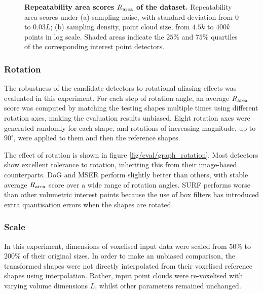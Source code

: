 \begin{figure}[ht]
\begin{subfigure}[t]{0.49\linewidth}
		\label{fig/eval/graph_sample}
	\end{subfigure}
	\caption{\textbf{Repeatability area scores $R_\textrm{area}$ of the \meshset dataset.} Repeatability area scores under (a) sampling noise, with standard deviation from $0$ to $0.03L$; (b) sampling density, \ie point cloud size, from $4.5k$ to $400k$ points in log scale. Shaded areas indicate the $25\%$ and $75\%$ quartiles of the corresponding interest point detectors.}
	\label{fig/eval/graph_graph0} 
\end{figure}

\subsubsection{Rotation}

The robustness of the candidate detectors to rotational aliasing effects was evaluated in this experiment. For each step of rotation angle, an average $R_\textrm{area}$ score was computed by matching the testing shapes multiple times using different rotation axes, making the evaluation results unbiased. Eight rotation axes were generated randomly for each shape, and rotations of increasing magnitude, up to $90^\circ$, were applied to them and then the reference shapes. 

The effect of rotation is shown in figure \ref{fig/eval/graph_rotation}. Most detectors show excellent tolerance to rotation, inheriting this from their image-based counterparts. 
DoG and MSER perform slightly better than others, with stable average $R_\textrm{area}$ score over a wide range of rotation angles. SURF performs worse than other volumetric interest points because the use of box filters has introduced extra quantisation errors when the shapes are rotated.

\subsubsection{Scale}

In this experiment, dimensions of voxelised input data were scaled from $50\%$ to $200\%$ of their original sizes. In order to make an unbiased comparison, the transformed shapes were not directly interpolated from their voxelised reference shapes using interpolation. Rather, input point clouds were re-voxelised with varying volume dimensions $L$, whilst other parameters remained unchanged. 

